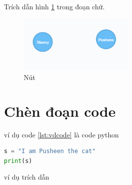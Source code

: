 Trích dẫn hình \ref{fig:node} trong đoạn chữ. 

\begin{figure}[h]
\centering
\includegraphics[width=0.5\textwidth]{image/node.PNG}
\caption{\label{fig:node} Nút}
\end{figure}


\section{Chèn đoạn code}


ví dụ code \ref{lst:vdcode} là code python 


\begin{lstlisting}[caption={Đoạn code}, label={lst:vdcode}, language=python]
s = "I am Pusheen the cat"
print(s)
\end{lstlisting}

ví dụ trích dẫn \cite{robinson2013graph}












